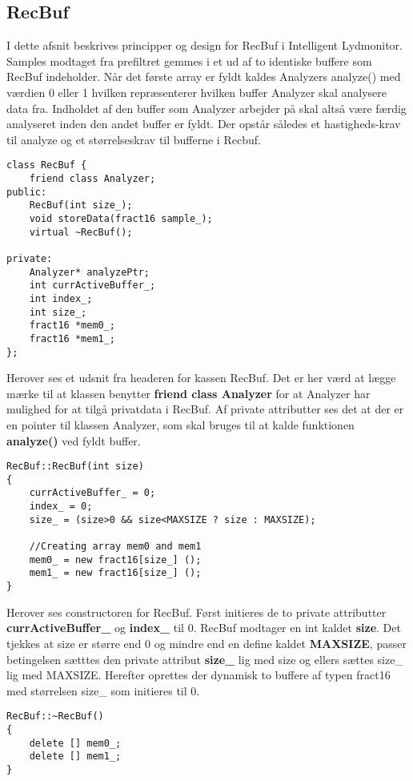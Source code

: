 \subsection{RecBuf}
I dette afsnit beskrives principper og design for RecBuf i Intelligent Lydmonitor.
Samples modtaget fra prefiltret gemmes i et ud af to identiske buffere som RecBuf indeholder. Når det første array er fyldt kaldes Analyzers analyze() med værdien 0 eller 1 hvilken repræsenterer hvilken buffer Analyzer skal analysere data fra. Indholdet af den buffer som Analyzer arbejder på skal altså være færdig analyseret inden den andet buffer er fyldt. Der opstår således et hastigheds-krav til analyze og et størrelseskrav til bufferne i Recbuf. 

\begin{verbatim}
class RecBuf {
	friend class Analyzer;
public:
	RecBuf(int size_);
	void storeData(fract16 sample_);
	virtual ~RecBuf();
	
private:
	Analyzer* analyzePtr;
	int currActiveBuffer_;
	int index_;
	int size_;
	fract16 *mem0_;
	fract16 *mem1_;
};
\end{verbatim}

Herover ses et udsnit fra headeren for kassen RecBuf. Det er her værd at lægge mærke til at klassen benytter \textbf{friend class Analyzer} for at Analyzer har mulighed for at tilgå privatdata i RecBuf. Af private attributter ses det at der er en pointer til klassen Analyzer, som skal bruges til at kalde funktionen \textbf{analyze()} ved fyldt buffer. 

\begin{verbatim}
RecBuf::RecBuf(int size)
{
	currActiveBuffer_ = 0;
	index_ = 0;
	size_ = (size>0 && size<MAXSIZE ? size : MAXSIZE);

	//Creating array mem0 and mem1
	mem0_ = new fract16[size_] ();
	mem1_ = new fract16[size_] ();
}
\end{verbatim}

Herover ses constructoren for RecBuf. Først initieres de to private attributter \textbf{currActiveBuffer\_} og \textbf{index\_} til 0. RecBuf modtager en int kaldet \textbf{size}. Det tjekkes at size er større end 0 og mindre end en define kaldet \textbf{MAXSIZE}, passer betingelsen sætttes den private attribut \textbf{size\_} lig med size og ellers sættes size\_ lig med MAXSIZE. Herefter oprettes der dynamisk to buffere af typen fract16 med størrelsen size\_ som initieres til 0. 

\begin{verbatim}
RecBuf::~RecBuf()
{
	delete [] mem0_;
	delete [] mem1_;
}
\end{verbatim}

